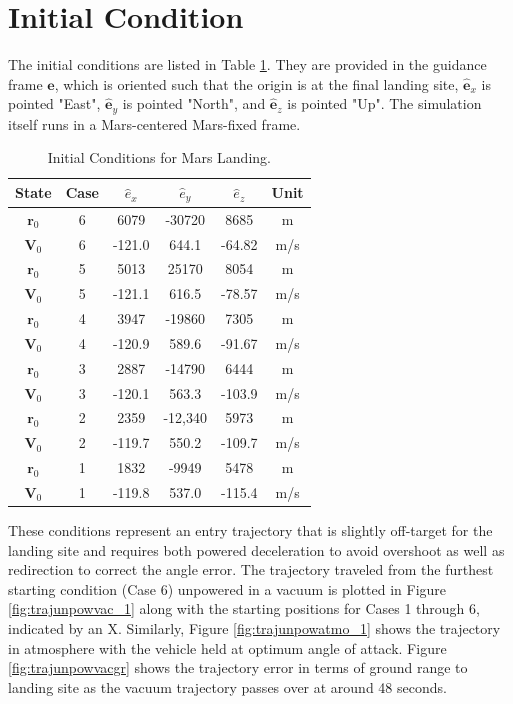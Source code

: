 \section{Initial Condition} \label{sec:IC}
The initial conditions are listed in Table \ref{tab:IC}. They are provided in the guidance frame $\hat{\bm{e}}$, which is oriented such that the origin is at the final landing site, $\hat{\bm{e}}_x$ is pointed "East", $\hat{\bm{e}}_y$ is pointed "North", and $\hat{\bm{e}}_z$ is pointed "Up". The simulation itself runs in a Mars-centered Mars-fixed frame. 

\begin{table}[hbt]
	\centering
	\begin{minipage}{3.5in}
		\centering
		\caption{Initial Conditions for Mars Landing\label{tab:IC}.}
		\begin{tabular}{|c||c|c|c|c|c||}    \hline
			State &	Case & $\hat{e}_x$  &  $\hat{e}_y$ & $\hat{e}_z$ & Unit \\ \hline \hline
			$\bm{r}_0$ & 6 & 6079  & -30720 & 8685 & m \\ \hline
			$\bm{V}_0$ & 6 & -121.0  & 644.1 & -64.82 & m/s \\ \hline
			$\bm{r}_0$ & 5 & 5013  & 25170 & 8054 & m \\ \hline
			$\bm{V}_0$ & 5 & -121.1  & 616.5 & -78.57 & m/s \\ \hline
			$\bm{r}_0$ & 4 & 3947  & -19860 & 7305 & m\\ \hline
			$\bm{V}_0$ & 4 & -120.9  & 589.6 & -91.67 & m/s \\ \hline
			$\bm{r}_0$ & 3 & 2887  & -14790 & 6444 & m \\ \hline
			$\bm{V}_0$ & 3 & -120.1  & 563.3 & -103.9 & m/s \\ \hline
			$\bm{r}_0$ & 2 & 2359  & -12,340 & 5973 & m \\ \hline
			$\bm{V}_0$ & 2 & -119.7  & 550.2 & -109.7 & m/s \\ \hline
			$\bm{r}_0$ & 1 & 1832 & -9949 & 5478 & m \\ \hline
			$\bm{V}_0$ & 1 & -119.8 & 537.0 & -115.4 & m/s \\ \hline
		\end{tabular}
	\end{minipage}
\end{table}

These conditions represent an entry trajectory that is slightly off-target for the landing site and requires both powered deceleration to avoid overshoot as well as redirection to correct the angle error. The trajectory traveled from the furthest starting condition (Case 6) unpowered in a vacuum is plotted in Figure \ref{fig:trajunpowvac_1} along with the starting positions for Cases 1 through 6, indicated by an X. Similarly, Figure \ref{fig:trajunpowatmo_1} shows the trajectory in atmosphere with the vehicle held at optimum angle of attack. Figure \ref{fig:trajunpowvacgr} shows the trajectory error in terms of ground range to landing site as the vacuum trajectory passes over at around 48 seconds.

